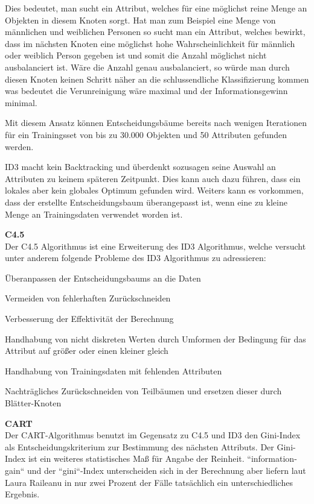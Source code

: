 Dies bedeutet, man sucht ein Attribut, welches für eine möglichst reine Menge an Objekten in diesem Knoten sorgt. Hat man zum Beispiel eine Menge von männlichen und weiblichen Personen so sucht man ein Attribut, welches bewirkt, dass im nächsten Knoten eine möglichst hohe Wahrscheinlichkeit für männlich oder weiblich Person gegeben ist und somit die Anzahl möglichst nicht ausbalanciert ist. Wäre die Anzahl genau ausbalanciert, so würde man durch diesen Knoten keinen Schritt näher an die schlussendliche Klassifizierung kommen was bedeutet die Verunreinigung wäre maximal und der Informationsgewinn minimal.

Mit diesem Ansatz können Entscheidungsbäume bereits nach wenigen Iterationen für ein Trainingsset von bis zu 30.000 Objekten und 50 Attributen gefunden werden. \cite{john_ross_quinlan_1986}

ID3 macht kein Backtracking und überdenkt sozusagen seine Auswahl an Attributen zu keinem späteren Zeitpunkt. Dies kann auch dazu führen, dass ein lokales aber kein globales Optimum gefunden wird. \cite{howard_hamilton_machine_2009} Weiters kann es vorkommen, dass der erstellte Entscheidungsbaum überangepasst ist, wenn eine zu kleine Menge an Trainingsdaten verwendet worden ist. \cite{rapidminer_rapidminer_2015}

\textbf{C4.5} \\
Der C4.5 Algorithmus ist eine Erweiterung des ID3 Algorithmus, welche versucht unter anderem folgende Probleme des ID3 Algorithmus zu adressieren:  \cite{howard_hamilton_machine_2009}

\begin{pitemize}
\item Überanpassen der Entscheidungsbaums an die Daten
\item Vermeiden von fehlerhaften Zurückschneiden
\item Verbesserung der Effektivität der Berechnung
\item Handhabung von nicht diskreten Werten durch Umformen der Bedingung für das Attribut auf  größer oder einen kleiner gleich
\item Handhabung von Trainingsdaten mit fehlenden Attributen
\item Nachträgliches Zurückschneiden von Teilbäumen und ersetzen dieser durch Blätter-Knoten
\end{pitemize}

\textbf{CART} \\
Der CART-Algorithmus benutzt im Gegensatz zu C4.5 und ID3 den Gini-Index als Entscheidungskriterium zur Bestimmung des nächsten Attributs. \cite{rapidminer_rapidminer_2015} Der Gini-Index ist ein weiteres statistisches Maß für Angabe der Reinheit. ``information-gain`` und der ``gini``-Index unterscheiden sich in der Berechnung aber liefern laut Laura Raileanu in nur zwei Prozent der Fälle tatsächlich ein unterschiedliches Ergebnis.  \cite{laura_raileanu_2004}

